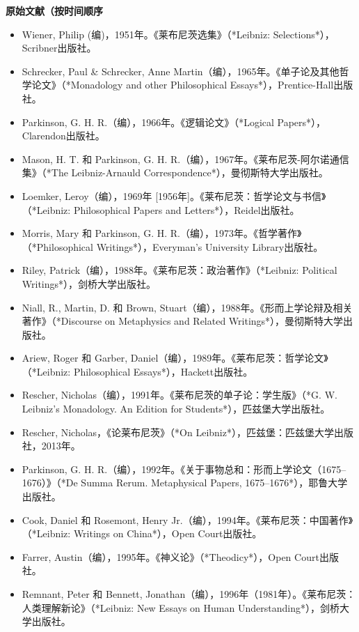\textbf{原始文献（按时间顺序}
\begin{itemize}
\item Wiener, Philip (编)，1951年。《莱布尼茨选集》（*Leibniz: Selections*），Scribner出版社。
\item Schrecker, Paul & Schrecker, Anne Martin（编），1965年。《单子论及其他哲学论文》（*Monadology and other Philosophical Essays*），Prentice-Hall出版社。
\item Parkinson, G. H. R.（编），1966年。《逻辑论文》（*Logical Papers*），Clarendon出版社。
\item Mason, H. T. 和 Parkinson, G. H. R.（编），1967年。《莱布尼茨-阿尔诺通信集》（*The Leibniz-Arnauld Correspondence*），曼彻斯特大学出版社。
\item Loemker, Leroy（编），1969年 [1956年]。《莱布尼茨：哲学论文与书信》（*Leibniz: Philosophical Papers and Letters*），Reidel出版社。
\item Morris, Mary 和 Parkinson, G. H. R.（编），1973年。《哲学著作》（*Philosophical Writings*），Everyman's University Library出版社。
\item Riley, Patrick（编），1988年。《莱布尼茨：政治著作》（*Leibniz: Political Writings*），剑桥大学出版社。
\item Niall, R., Martin, D. 和 Brown, Stuart（编），1988年。《形而上学论辩及相关著作》（*Discourse on Metaphysics and Related Writings*），曼彻斯特大学出版社。
\item Ariew, Roger 和 Garber, Daniel（编），1989年。《莱布尼茨：哲学论文》（*Leibniz: Philosophical Essays*），Hackett出版社。
\item Rescher, Nicholas（编），1991年。《莱布尼茨的单子论：学生版》（*G. W. Leibniz's Monadology. An Edition for Students*），匹兹堡大学出版社。
\item Rescher, Nicholas，《论莱布尼茨》（*On Leibniz*），匹兹堡：匹兹堡大学出版社，2013年。
\item Parkinson, G. H. R.（编），1992年。《关于事物总和：形而上学论文（1675–1676）》（*De Summa Rerum. Metaphysical Papers, 1675–1676*），耶鲁大学出版社。
\item Cook, Daniel 和 Rosemont, Henry Jr.（编），1994年。《莱布尼茨：中国著作》（*Leibniz: Writings on China*），Open Court出版社。
\item Farrer, Austin（编），1995年。《神义论》（*Theodicy*），Open Court出版社。
\item Remnant, Peter 和 Bennett, Jonathan（编），1996年（1981年）。《莱布尼茨：人类理解新论》（*Leibniz: New Essays on Human Understanding*），剑桥大学出版社。

\end{itemize}
